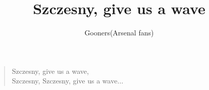 \documentclass[a4paper,12pt]{article}
\title{Szczesny, give us a wave}
\author{Gooners(Arsenal fans)}
\date{}
\begin{document}
	
	\maketitle
	
	\begin{verse}
		
		Szczesny, give us a wave, \\
		Szczesny, Szczesny, give us a wave$\ldots$
		
	\end{verse}
	
\end{document}
